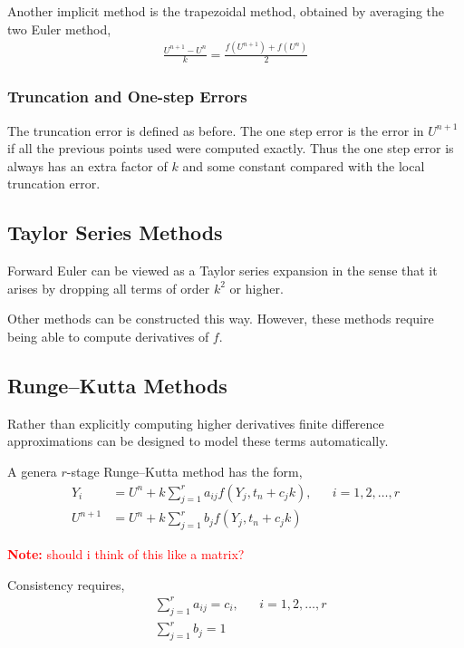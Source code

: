 \documentclass[12pt]{article}
\newcommand{\note}[1]{\textcolor{red}{\textbf{Note:} #1}}
\begin{document}
Another implicit method is the trapezoidal method, obtained by averaging the two Euler method,
\begin{align*}
    \frac{U^{n+1}-U^n}{k} = \frac{f(U^{n+1}) + f(U^n)}{2}
\end{align*}

\subsubsection{Truncation and One-step Errors}
The truncation error is defined as before. The one step error is the error in \( U^{n+1} \) if all the previous points used were computed exactly. Thus the one step error is always has an extra factor of \( k \) and some constant compared with the local truncation error.

\subsection{Taylor Series Methods}
Forward Euler can be viewed as a Taylor series expansion in the sense that it arises by dropping all terms of order \( k^2 \) or higher.

Other methods can be constructed this way. However, these methods require being able to compute derivatives of \( f \).


\subsection{Runge--Kutta Methods}
Rather than explicitly computing higher derivatives finite difference approximations can be designed to model these terms automatically.

\begin{definition}
A genera \( r \)-stage Runge--Kutta method has the form,
\begin{align*}
    Y_i &= U^n + k \sum_{j=1}^{r} a_{ij} f(Y_j, t_n + c_jk), && i=1,2,\ldots, r \\
    U^{n+1} &= U^n + k \sum_{j=1}^{r} b_j f(Y_j, t_n + c_j k)
\end{align*}
\end{definition}

\note{should i think of this like a matrix?}

Consistency requires,
\begin{align*}
    &\sum_{j=1}^{r} a_{ij} = c_i, && i=1,2,\ldots, r \\
    &\sum_{j=1}^{r} b_j = 1
\end{align*}
\end{document}

